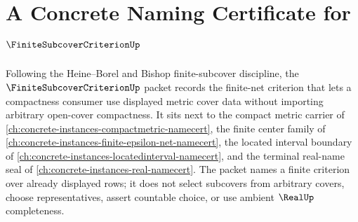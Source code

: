 \chapter{A Concrete Naming Certificate for $\FiniteSubcoverCriterionUp$}
\label{ch:concrete-instances-finite-subcover-criterion-namecert}

Following the Heine--Borel and Bishop finite-subcover discipline, the $\FiniteSubcoverCriterionUp$ packet records the finite-net criterion that lets a compactness consumer use displayed metric cover data without importing arbitrary open-cover compactness. It sits next to the compact metric carrier of \autoref{ch:concrete-instances-compactmetric-namecert}, the finite center family of \autoref{ch:concrete-instances-finite-epsilon-net-namecert}, the located interval boundary of \autoref{ch:concrete-instances-locatedinterval-namecert}, and the terminal real-name seal of \autoref{ch:concrete-instances-real-namecert}. The packet names a finite criterion over already displayed rows; it does not select subcovers from arbitrary covers, choose representatives, assert countable choice, or use ambient $\RealUp$ completeness.

